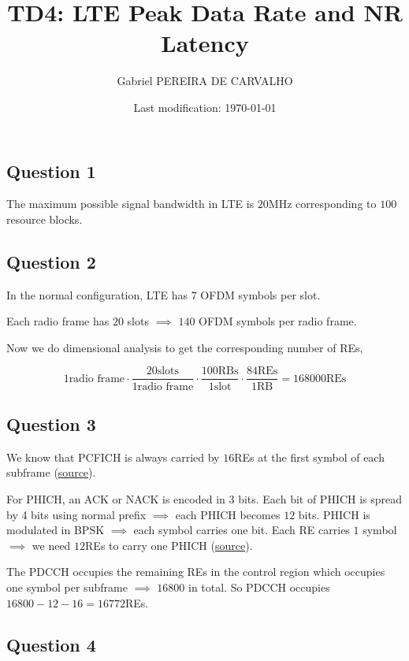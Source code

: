 \documentclass[]{article}
\title{TD4: LTE Peak Data Rate and NR Latency}
\author{Gabriel PEREIRA DE CARVALHO}
\date{Last modification: \today}
\begin{document}
	
	\maketitle
	
	\subsection*{Question 1}
	
	The maximum possible signal bandwidth in LTE is $20$MHz corresponding to $100$ resource blocks.
	
	\subsection*{Question 2}
	
	In the normal configuration, LTE has $7$ OFDM symbols per slot.
	
	Each radio frame has $20$ slots $\implies$ $140$ OFDM symbols per radio frame.
	
	Now we do dimensional analysis to get the corresponding number of REs,
	
	\begin{equation}
		1 \text{radio frame} \cdot \frac{20 \text{slots}}{1 \text{radio frame}} \cdot \frac{100 \text{RBs}}{1 \text{slot}} \cdot \frac{84 \text{REs}}{1 \text{RB}} = 168000 \text{REs}
	\end{equation}
	
	\subsection*{Question 3}
	
	We know that PCFICH is always carried by $16$REs at the first symbol of each subframe (\href{https://sharetechnote.com/html/Handbook_LTE_PCFICH.html}{source}).
	
	For PHICH, an ACK or NACK is encoded in 3 bits. Each bit of PHICH is spread by 4 bits using normal prefix $\implies$ each PHICH becomes $12$ bits. PHICH is modulated in BPSK $\implies$ each symbol carries one bit. Each RE carries $1$ symbol $\implies$ we need $12$REs to carry one PHICH (\href{https://sharetechnote.com/html/Handbook_LTE_PHICH_PHICHGroup.html}{source}).
	
	The PDCCH occupies the remaining REs in the control region which occupies one symbol per subframe $\implies$  $16800$  in total. So PDCCH occupies
	$16800 - 12 - 16 = 16772$REs.
	
	\subsection*{Question 4}
	
\end{document}
